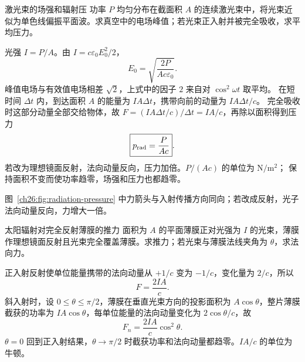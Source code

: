 \begin{origexamplebox}{激光束的场强和辐射压}
功率 $P$ 均匀分布在截面积 $A$ 的连续激光束中，将光束近似为单色线偏振平面波。求真空中的电场峰值；若光束正入射并被完全吸收，求平均压力。
\end{origexamplebox}
\begin{xesolution}
光强 $I=P/A$。由 $I=c\varepsilon_0E_0^2/2$，
\[
 \boxed{E_0=\sqrt{\frac{2P}{Ac\varepsilon_0}}}.
\]
峰值电场与有效值电场相差 $\sqrt2$，上式中的因子 $2$ 来自对 $\cos^2\omega t$ 取平均。
在短时间 $\Delta t$ 内，到达面积 $A$ 的能量为 $IA\Delta t$，携带向前的动量为 $IA\Delta t/c$。
完全吸收时这部分动量全部交给物体，故 $F=(IA\Delta t/c)/\Delta t=IA/c$，再除以面积得到压力
\[
 \boxed{p_{\rm rad}=\frac{P}{Ac}}.
\]
若改为理想镜面反射，法向动量反向，压力加倍。$P/(Ac)$ 的单位为 $\mathrm{N/m^2}$；
保持面积不变而使功率趋零，场强和压力也都趋零。
\end{xesolution}

\begin{center}
\label{ch26:fig:radiation-pressure}
\end{center}
图~\ref{ch26:fig:radiation-pressure} 中力箭头与入射传播方向同向；若改成反射，光子法向动量反向，力增大一倍。

\begin{origexamplebox}{太阳辐射对完全反射薄膜的推力}
面积为 $A$ 的平面薄膜正对光强为 $I$ 的光束，薄膜作理想镜面反射且光束完全覆盖薄膜。求推力；若光束与薄膜法线夹角为 $\theta$，求法向力。
\end{origexamplebox}
\begin{xesolution}
正入射反射使单位能量携带的法向动量从 $+1/c$ 变为 $-1/c$，变化量为 $2/c$，所以
\[
 \boxed{F=\frac{2IA}{c}}.
\]
斜入射时，设 $0\le\theta\le\pi/2$，薄膜在垂直光束方向的投影面积为 $A\cos\theta$，整片薄膜截获的功率为 $IA\cos\theta$，每单位能量的法向动量变化为
$2\cos\theta/c$，故
\[
 \boxed{F_n=\frac{2IA}{c}\cos^2\theta}.
\]
$\theta=0$ 回到正入射结果，$\theta\to\pi/2$ 时截获功率和法向动量都趋零。$IA/c$ 的单位为牛顿。
\end{xesolution}

